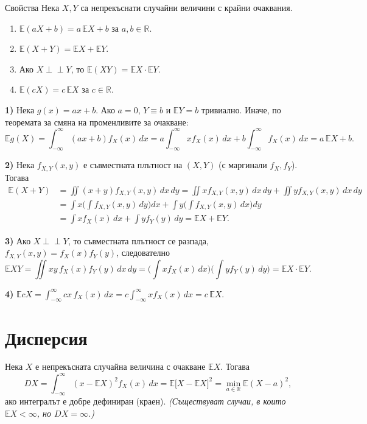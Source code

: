 \begin{thmbox}{Свойства}
Нека $X,Y$ са непрекъснати случайни величини с крайни очаквания.
\begin{enumerate}[label=\arabic*)]
  \item $\mathbb E(aX+b) = a\,\mathbb EX+b$ за $a,b\in\mathbb R$.
  \item $\mathbb E(X+Y) = \mathbb EX+\mathbb EY$.
  \item Ако $X\perp\!\!\!\perp Y$, то $\mathbb E(XY)=\mathbb EX\cdot\mathbb EY$.
  \item $\mathbb E(cX) = c\,\mathbb EX$ за $c\in\mathbb R$.
\end{enumerate}
\end{thmbox}

\begin{proofbox}
\textbf{1)} Нека $g(x)=ax+b$. Ако $a=0$, $Y\equiv b$ и $\mathbb EY=b$
тривиално. Иначе, по теоремата за смяна на променливите за очакване:
\[
  \mathbb Eg(X) = \int_{-\infty}^{\infty}(ax+b)f_X(x)\,dx = a\int_{-\infty}^{\infty}xf_X(x)\,dx + b\int_{-\infty}^{\infty}f_X(x)\,dx = a\,\mathbb EX+b.
\]

\textbf{2)} Нека $f_{X,Y}(x,y)$ е съвместната плътност на $(X,Y)$
(с маргинали $f_X,f_Y$). Тогава
\begin{align*}
  \mathbb E(X+Y) &= \iint (x+y)f_{X,Y}(x,y)\,dx\,dy = \iint x f_{X,Y}(x,y)\,dx\,dy + \iint y f_{X,Y}(x,y)\,dx\,dy\\
  &= \int x\Big(\int f_{X,Y}(x,y)\,dy\Big)dx + \int y\Big(\int f_{X,Y}(x,y)\,dx\Big)dy\\
  &= \int x f_X(x)\,dx + \int y f_Y(y)\,dy = \mathbb EX+\mathbb EY.
\end{align*}

\textbf{3)} Ако $X\perp\!\!\!\perp Y$, то съвместната плътност се
разпада, $f_{X,Y}(x,y)=f_X(x)f_Y(y)$, следователно
\[
  \mathbb EXY = \iint xy\,f_X(x)f_Y(y)\,dx\,dy = \Big(\int xf_X(x)\,dx\Big)\Big(\int yf_Y(y)\,dy\Big) = \mathbb EX\cdot\mathbb EY.
\]

\textbf{4)} $\mathbb EcX = \int_{-\infty}^{\infty} cx\,f_X(x)\,dx = c\int_{-\infty}^{\infty}xf_X(x)\,dx = c\,\mathbb EX$. \qedbg
\end{proofbox}

\section{Дисперсия}

\begin{defbox}
Нека $X$ е непрекъсната случайна величина с очакване $\mathbb EX$.
Тогава
\[
  DX = \int_{-\infty}^{\infty} (x-\mathbb EX)^2 f_X(x)\,dx = \mathbb E\big[X-\mathbb EX\big]^2 = \min_{a\in\mathbb R}\mathbb E(X-a)^2,
\]
ако интегралът е добре дефиниран (краен). \emph{(Съществуват случаи,
в които $\mathbb EX<\infty$, но $DX=\infty$.)}
\end{defbox}

